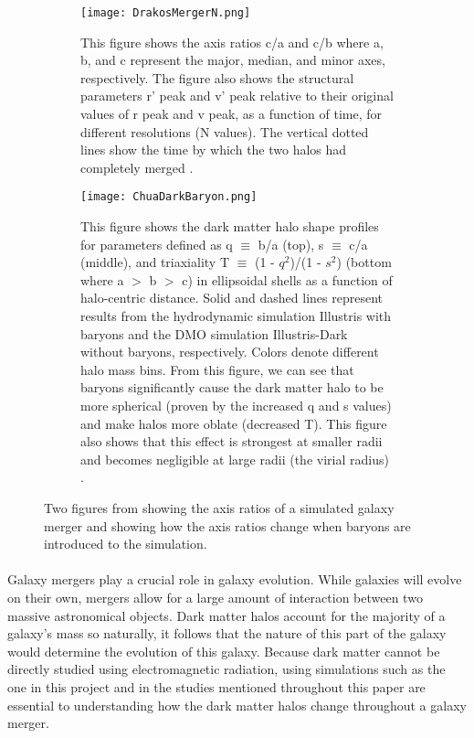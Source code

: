 \documentclass[linenumbers,trackchanges]{aastex7}
\begin{document}
\begin{figure}[h!]
\centering
    \begin{subfigure}[t]{.45\textwidth}
    \centering
      \texttt{[image: DrakosMergerN.png]}
      \caption{This figure shows the axis ratios c/a and c/b where a, b, and c represent the major, median, and minor axes, respectively. The figure also shows the structural parameters r' peak and v' peak relative to their original values of r peak and v peak, as a function of time, for different resolutions (N values). The vertical dotted lines show the time by which the two halos had completely merged \citep{Drakos+2019}.}
      \label{fig:DrakosMerge}
    \end{subfigure}
    \begin{subfigure}[t]{.45\textwidth}
    \centering
      \texttt{[image: ChuaDarkBaryon.png]}
      \caption{This figure shows the dark matter halo shape profiles for parameters defined as q $\equiv$ b/a (top), s $\equiv$ c/a (middle), and triaxiality T $\equiv$ (1 - $q^2$)/(1 - $s^2$) (bottom where a $>$ b $>$ c) in ellipsoidal shells as a function of halo-centric distance. Solid and dashed lines represent results from the hydrodynamic simulation Illustris with baryons and the DMO simulation Illustris-Dark without baryons, respectively. Colors denote different halo mass bins. From this figure, we can see that baryons significantly cause the dark matter halo to be more spherical (proven by the increased q and s values) and make halos more oblate (decreased T). This figure also shows that this effect is strongest at smaller radii and becomes negligible at large radii (the virial radius) \citep{Chua+2019}.}
      \label{fig:ChuaBaryon}
    \end{subfigure}
\caption{Two figures from \cite{Drakos+2019} showing the axis ratios of a simulated galaxy merger and \cite{Chua+2019} showing how the axis ratios change when baryons are introduced to the simulation.}
\label{fig:AxisRatios}
\end{figure}

\paragraph{} Galaxy mergers play a crucial role in galaxy evolution. While galaxies will evolve on their own, mergers allow for a large amount of interaction between two massive astronomical objects. Dark matter halos account for the majority of a galaxy's mass so naturally, it follows that the nature of this part of the galaxy would determine the evolution of this galaxy. Because dark matter cannot be directly studied using electromagnetic radiation, using simulations such as the one in this project and in the studies mentioned throughout this paper are essential to understanding how the dark matter halos change throughout a galaxy merger.
\end{document}
